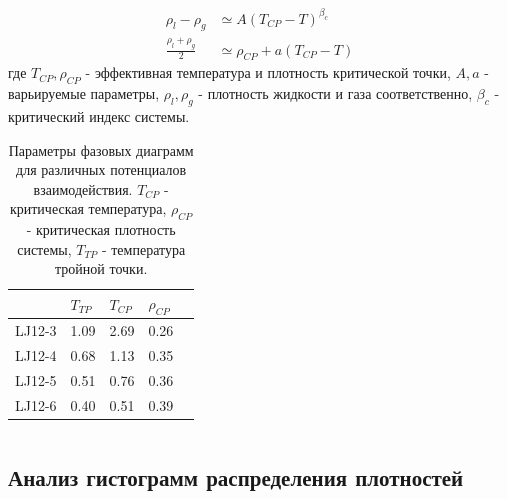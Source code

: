 \documentclass[pdf,hyperref={unicode}]{beamer}
\begin{document}
\begin{frame}
\begin{columns}
\begin{column}{0.45\linewidth}
{\tiny{
\begin{equation}
\begin{aligned}
\rho_l - \rho_g &\simeq A (T_{CP} - T)^{\beta_c} \\
\frac{\rho_l + \rho_g}{2} &\simeq \rho_{CP} + a(T_{CP} - T)
\end{aligned}
\label{eqFitFhase}
\end{equation}
где $T_{CP}, \rho_{CP}$ - эффективная температура и плотность критической точки, $A, a$ - варьируемые параметры, $\rho_l, \rho_g$ - плотность жидкости и газа соответственно, $\beta_c$ - критический индекс системы.
}}
{
\tiny{
\begin{table}[h]
\begin{tabular}{| l | l | l | l | l |}
\hline
    & $T_{TP}$  & $T_{CP}$  & $\rho_{CP}$   \\ \hline
LJ12-3  & 1.09  &  2.69   &  0.26   \\ \hline
LJ12-4  & 0.68  & 1.13    & 0.35    \\ \hline
LJ12-5  & 0.51  &  0.76   &  0.36   \\ \hline
LJ12-6  & 0.40  &  0.51   &  0.39   \\ \hline
\end{tabular}
\caption{\tiny Параметры фазовых диаграмм для различных потенциалов взаимодействия. $T_{CP}$ - критическая температура, $\rho_{CP}$ - критическая плотность системы, $T_{TP}$ - температура тройной точки.}
\label{tablSystemConst}
\end{table}
}
}
\end{column}

\end{columns}
\end{frame}




\subsection{Анализ гистограмм распределения плотностей}
\end{document}
